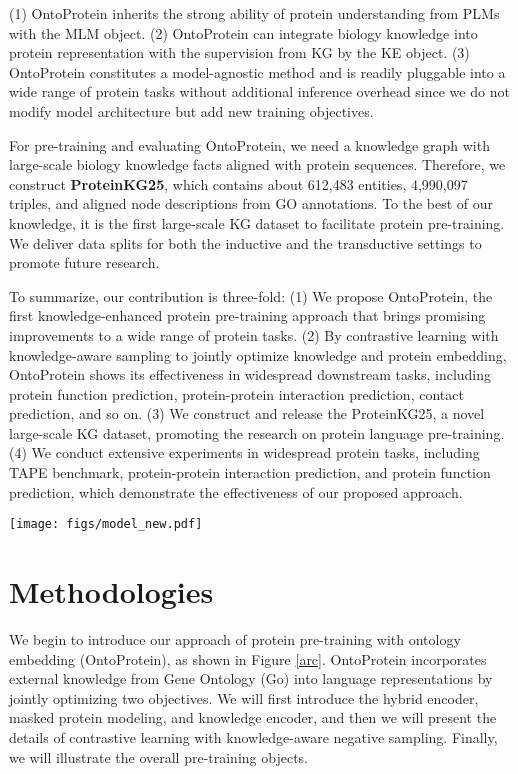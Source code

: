(1) OntoProtein inherits the strong ability of protein understanding from PLMs with the MLM object.
(2) OntoProtein can integrate biology knowledge into protein representation with the supervision from KG by the KE object.
(3) OntoProtein constitutes a model-agnostic method and is readily pluggable into a wide range of protein tasks without additional inference overhead since we do not modify model architecture but add new training objectives. 

For pre-training and evaluating OntoProtein, we need a knowledge graph with large-scale biology knowledge facts aligned with protein sequences.
Therefore, we construct \textbf{ProteinKG25}, which contains about 612,483 entities, 4,990,097 triples, and aligned node descriptions from GO annotations. 
To the best of our knowledge, it is the first large-scale KG dataset to facilitate protein pre-training.
We deliver data splits for both the inductive and the transductive settings to promote future research. 

To summarize, our contribution is three-fold:
(1) We propose OntoProtein, the first knowledge-enhanced protein pre-training approach that brings promising improvements to a wide range of protein tasks. 
(2) By contrastive learning with knowledge-aware sampling to jointly optimize knowledge and protein embedding, OntoProtein shows its effectiveness in widespread downstream tasks, including protein function prediction, protein-protein interaction prediction, contact prediction, and so on. 
(3) We construct and release the ProteinKG25, a novel large-scale KG dataset, promoting the research on protein language pre-training. 
(4) We conduct extensive experiments in widespread protein tasks, including TAPE benchmark, protein-protein interaction prediction, and protein function prediction, which demonstrate the effectiveness of our proposed approach.  

\begin{figure*}[t]
\centering
\texttt{[image: figs/model\_new.pdf]}
\caption{Overview of our proposed OntoProtein, which jointly optimize knowledge graph embedding and masked protein model (Best viewed in color.).
}
\label{arc}
\end{figure*}

\section{Methodologies}
We begin to introduce our approach of protein pre-training with ontology embedding (OntoProtein), as shown in Figure \ref{arc}.
OntoProtein incorporates external knowledge from Gene Ontology (Go) into language representations by jointly optimizing two objectives. 
We will first introduce the hybrid encoder, masked protein modeling, and knowledge encoder, and then we will present the details of contrastive learning with knowledge-aware negative sampling. 
Finally, we will illustrate the overall pre-training objects. 

